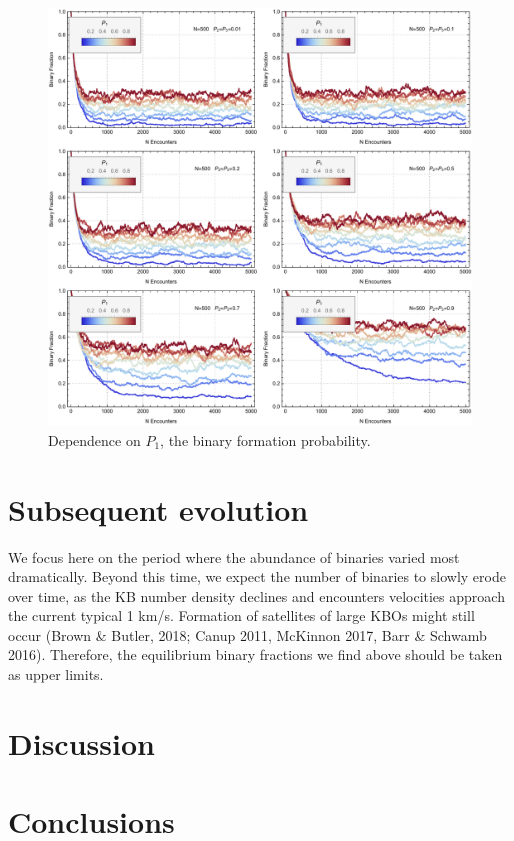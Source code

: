 \documentclass[a4paper,12pt]{article}
\begin{document}
\begin{figure}
\centering
\includegraphics[width=1\textwidth]{P1Matters}
\caption{\label{fig:doesP1matter}
Dependence on $P_1$, the binary formation probability.}
\end{figure}


\section{Subsequent evolution}
\label{sec:SubsequentEvolution}

We focus here on the period where the abundance of binaries varied most dramatically. Beyond this time, we expect the number of binaries to slowly erode over time, as the KB number density declines and encounters velocities approach the current typical 1 km/s. Formation of satellites of large KBOs might still occur (Brown \& Butler, 2018; Canup 2011, McKinnon 2017, Barr \& Schwamb 2016). Therefore, the equilibrium binary fractions we find above should be taken as upper limits.





\section{Discussion}
\label{sec:discussion}

\section{Conclusions}
\label{sec:conclusions}
\end{document}
